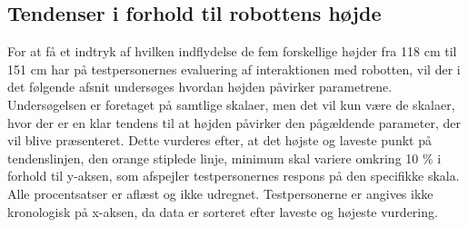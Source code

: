 \subsection{Tendenser i forhold til robottens højde}
\label{DatabehandlingRHeightTendenser}
%
For at få et indtryk af hvilken indflydelse de fem forskellige højder fra 118 cm til 151 cm har på testpersonernes evaluering af interaktionen med robotten, vil der i det følgende afsnit undersøges hvordan højden påvirker parametrene. Undersøgelsen er foretaget på samtlige skalaer, men det vil kun være de skalaer, hvor der er en klar tendens til at højden påvirker den pågældende parameter, der vil blive præsenteret. Dette vurderes efter, at det højste og laveste punkt på tendenslinjen, den orange stiplede linje, minimum skal variere omkring 10 \% i forhold til y-aksen, som afspejler testpersonernes respons på den specifikke skala. Alle procentsatser er aflæst og ikke udregnet. Testpersonerne er angives ikke kronologisk på x-aksen, da data er sorteret efter laveste og højeste vurdering. 

